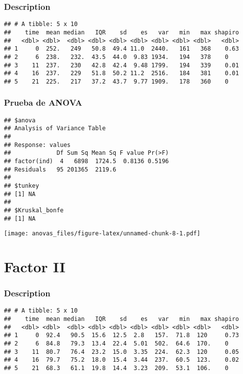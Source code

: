 \documentclass[
]{article}
\begin{document}
\hypertarget{description-3}{%
\subsubsection{Description}\label{description-3}}

\begin{verbatim}
## # A tibble: 5 x 10
##    time  mean median   IQR    sd    es   var   min   max shapiro
##   <dbl> <dbl>  <dbl> <dbl> <dbl> <dbl> <dbl> <dbl> <dbl>   <dbl>
## 1     0  252.   249   50.8  49.4 11.0  2440.   161   368    0.63
## 2     6  238.   232.  43.5  44.0  9.83 1934.   194   378    0   
## 3    11  237.   230   42.8  42.4  9.48 1799.   194   339    0.01
## 4    16  237.   229   51.8  50.2 11.2  2516.   184   381    0.01
## 5    21  225.   217   37.2  43.7  9.77 1909.   178   360    0
\end{verbatim}

\hypertarget{prueba-de-anova-3}{%
\subsubsection{Prueba de ANOVA}\label{prueba-de-anova-3}}

\begin{verbatim}
## $anova
## Analysis of Variance Table
## 
## Response: values
##             Df Sum Sq Mean Sq F value Pr(>F)
## factor(ind)  4   6898  1724.5  0.8136 0.5196
## Residuals   95 201365  2119.6               
## 
## $tunkey
## [1] NA
## 
## $Kruskal_bonfe
## [1] NA
\end{verbatim}

\texttt{[image: anovas\_files/figure-latex/unnamed-chunk-8-1.pdf]}

\hypertarget{factor-ii}{%
\section{Factor II}\label{factor-ii}}

\hypertarget{description-4}{%
\subsubsection{Description}\label{description-4}}

\begin{verbatim}
## # A tibble: 5 x 10
##    time  mean median   IQR    sd    es   var   min   max shapiro
##   <dbl> <dbl>  <dbl> <dbl> <dbl> <dbl> <dbl> <dbl> <dbl>   <dbl>
## 1     0  92.4   90.5  15.6  12.5  2.8   157.  71.8  120     0.73
## 2     6  84.8   79.3  13.4  22.4  5.01  502.  64.6  170.    0   
## 3    11  80.7   76.4  23.2  15.0  3.35  224.  62.3  120     0.05
## 4    16  79.7   75.2  18.0  15.4  3.44  237.  60.5  123.    0.02
## 5    21  68.3   61.1  19.8  14.4  3.23  209.  53.1  106.    0
\end{verbatim}
\end{document}
